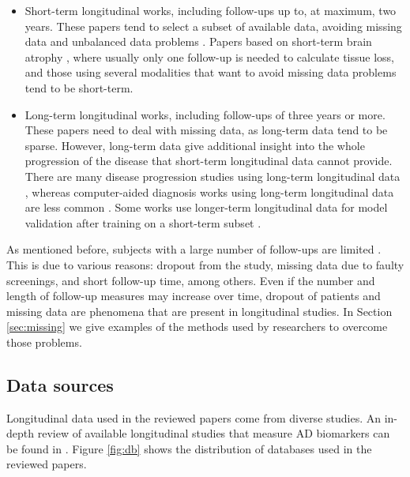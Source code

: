\begin{itemize}\itemsep7pt

\item Short-term longitudinal works, including follow-ups up to, at maximum, two years. These papers tend to select a subset of available data, avoiding missing data and unbalanced data problems \cite{Ardekani2016,Fiot2012,Fiot2014,Gray2012,Rodrigues2014,Shi2015,Shi2017}. Papers based on short-term brain atrophy \cite{Huang2012,Hyun2016,McEvoy2011,Sanroma2017,Vounou2012}, where usually only one follow-up is needed to calculate tissue loss, and those using several modalities that want to avoid missing data problems \cite{Chen2011b,Hinrichs2011,Jack2009} tend to be short-term.

\item Long-term longitudinal works, including follow-ups of three years or more. These papers need to deal with missing data, as long-term data tend to be sparse. However, long-term data give additional insight into the whole progression of the disease that short-term longitudinal data cannot provide. There are many disease progression studies using long-term longitudinal data \cite{Desikan2011,Guillaume2014,Guerrero2016,Bilgel2015a,Bilgel2016,Iturria-Medina2016,Li2017b,Aghili2018}, whereas computer-aided diagnosis works using long-term longitudinal data are less common \cite{Chi2017,Minhas2016}. Some works use longer-term longitudinal data for model validation after training on a short-term subset \cite{Young2015a}.
\end{itemize}

As mentioned before, subjects with a large number of follow-ups are limited \cite{Lawrence2017}. This is due to various reasons: dropout from the study, missing data due to faulty screenings, and short follow-up time, among others. Even if the number and length of follow-up measures may increase over time, dropout of patients and missing data are phenomena that are present in longitudinal studies. In Section \ref{sec:missing} we give examples of the methods used by researchers to overcome those problems. \\

\subsection{Data sources}

Longitudinal data used in the reviewed papers come from diverse studies. An in-depth review of available longitudinal studies that measure AD biomarkers can be found in \cite{Lawrence2017}. Figure \ref{fig:db} shows the distribution of databases used in the reviewed papers.  \\

